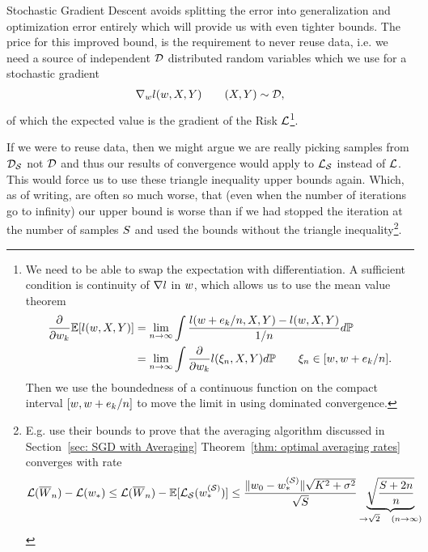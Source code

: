 Stochastic Gradient Descent avoids splitting the error into generalization and
optimization error entirely which will provide us with even tighter bounds. The
price for this improved bound, is the requirement to never reuse data, i.e. we
need a source of independent \(\mathcal{D}\) distributed random variables which we use
for a stochastic gradient
%
\begin{align*}
	\nabla_wl (w, X,Y) \qquad (X,Y)\sim\mathcal{D},
\end{align*}
%
of which the expected value is the gradient of the Risk \(\mathcal{L}\)\footnote{
	We need to be able to swap the expectation with differentiation. A sufficient 
	condition is continuity of \(\nabla l\) in \(w\), which allows us
	to use the mean value theorem
	\begin{align*}
		\frac{\partial}{\partial w_k}\mathbb{E}[l(w, X,Y)]
		&= \lim_{n\to\infty}
		\int\frac{l(w+e_k/n, X,Y)-l(w,X,Y)}{1/n}d\mathbb{P}
		\\
		&=\lim_{n\to\infty} \int\frac{\partial}{\partial w_k}l(\xi_n, X,Y)d\mathbb{P}
		\qquad \xi_n \in [w, w + e_k/n].
	\end{align*}
	Then we use the boundedness of a continuous function on the compact interval
	\([w, w + e_k/n]\) to move the limit in using
	dominated convergence.
}.

If we were to reuse data, then we might argue we are really picking samples
from \(\mathcal{D}_{\mathcal{S}}\) not \(\mathcal{D}\) and thus our results of convergence would
apply to \(\mathcal{L}_{\mathcal{S}}\) instead of \(\mathcal{L}\). This would force us to use
these triangle inequality upper bounds again. Which, as of writing, are often so
much worse, that (even when the number of iterations go to infinity) our upper
bound is worse than if we had stopped the iteration at the number of samples
\(S\) and used the bounds without the triangle inequality\footnote{
	E.g. \textcite{hardtTrainFasterGeneralize2016} use their bounds to prove that
	the averaging algorithm discussed in Section~\ref{sec: SGD with Averaging}
	Theorem~\ref{thm: optimal averaging rates} converges with rate
	\begin{align*}
		\mathcal{L}(\overline{W}_n) - \mathcal{L}(w_*)
		\le \mathcal{L}(\overline{W}_n) - \mathbb{E}[\mathcal{L}_{\mathcal{S}}(w_*^{(\mathcal{S})})]
		\le \frac{\|w_0 -w_*^{(\mathcal{S})}\|\sqrt{K^2 + \sigma^2}}{\sqrt{S}}
		\underbrace{\sqrt{\frac{S+2n}{n}}}_{\to \sqrt{2} \quad (n\to\infty)}
	\end{align*}
}.

